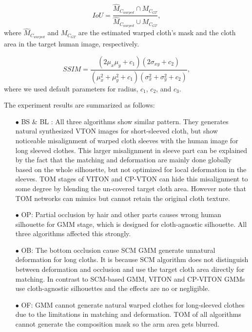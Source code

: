 \begin{equation}
 IoU = \frac{ \hat{M}_{C_{warped}} \cap M_{C_{GT}}}
            { \hat{M}_{C_{warped}} \cup M_{C_{GT}}},
\end{equation} 
where $\hat{M}_{C_{warped}}$ and $M_{C_{GT}}$ are the estimated warped cloth's mask and the cloth area in the target human image, respectively. 

\begin{equation}
 SSIM = \frac{ ( 2 \mu_x \mu_y + c_1 )(2 \sigma_{xy} + c_2) }
             { ( \mu^2_x + \mu^2_y +c_1) ( \sigma^2_x + \sigma^2_y + c_2)}, 
\end{equation}
where we used default parameters for radius, $c_1$, $c_2$, and $c_3$. 

The experiment results are summarized as follows:

\begin{itemize}

\item[$\bullet$] BS $\&$ BL : All three algorithms show similar pattern. They generates natural synthesized VTON images for short-sleeved cloth, but show noticeable misalignment of warped cloth sleeves with the human image for long sleeved clothes. This larger misalignment in sleeve part can be explained by the fact that the matching and deformation are mainly done globally based on the whole silhouette, but not optimized for local deformation in the sleeves. 
TOM stages of VITON and CP-VTON can hide this misalignment to some degree by blending the un-covered target cloth area. However note that TOM networks can mimics but cannot retain the original cloth texture. 

\item[$\bullet$] OP: Partial occlusion by hair and other parts causes wrong human silhouette for GMM stage, which is designed for cloth-agnostic silhouette. All three algorithms affected this strongly. 

\item[$\bullet$] OB: The bottom occlusion cause SCM GMM generate unnatural deformation for long cloths. It is because SCM algorithm does not distinguish between deformation and occlusion and use the target cloth area directly for matching. In contrast to SCM-based GMM, VITON and CP-VITON GMMs use cloth-agnostic silhouettes and the effects are no or negligible.  

\item[$\bullet$] OF: GMM cannot generate natural warped clothes for long-sleeved clothes due to the limitations in matching and deformation.  TOM of all algorithms cannot generate the composition mask so the arm area gets blurred.  


\end{itemize}
